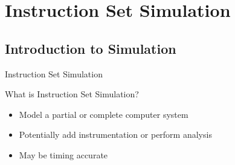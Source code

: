 \section{Instruction Set Simulation}

\subsection{Introduction to Simulation}

\begin{frame}{Instruction Set Simulation}

What is Instruction Set Simulation? 

\begin{itemize}
\item<2-> Model a partial or complete computer system
\item<3-> Potentially add instrumentation or perform analysis
\item<4-> May be timing accurate
\end{itemize}

\end{frame}

